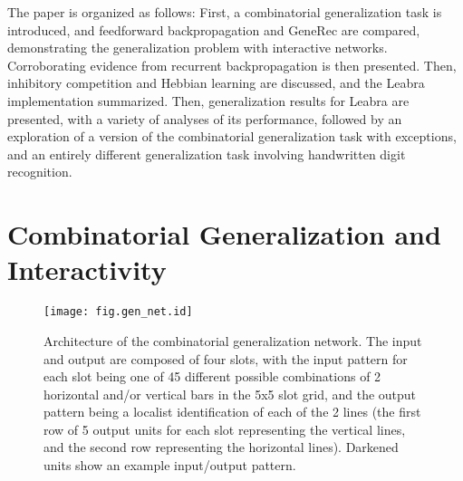 \documentclass[12pt,twoside]{article}
\begin{document}
The paper is organized as follows: First, a combinatorial
generalization task is introduced, and feedforward backpropagation and
GeneRec are compared, demonstrating the generalization problem with
interactive networks.  Corroborating evidence from recurrent
backpropagation is then presented.  Then, inhibitory competition and
Hebbian learning are discussed, and the Leabra implementation
summarized.  Then, generalization results for Leabra are presented,
with a variety of analyses of its performance, followed by an
exploration of a version of the combinatorial generalization task with
exceptions, and an entirely different generalization task involving
handwritten digit recognition.

\section{Combinatorial Generalization and Interactivity}

\begin{figure}
  \centering\texttt{[image: fig.gen\_net.id]}
  \caption{\small Architecture of the combinatorial generalization
    network.  The input and output are composed of four slots, with
    the input pattern for each slot being one of 45 different possible
    combinations of 2 horizontal and/or vertical bars in the 5x5 slot
    grid, and the output pattern being a localist identification of
    each of the 2 lines (the first row of 5 output units for each slot
    representing the vertical lines, and the second row representing
    the horizontal lines).  Darkened units show an example input/output
    pattern.}
  \label{fig.gen_net}
\end{figure}
\end{document}
